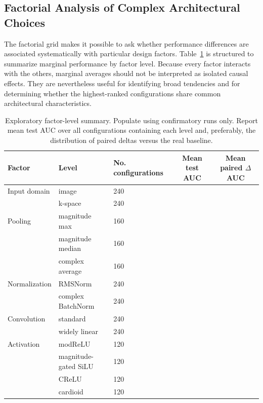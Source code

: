 \documentclass[journal]{IEEEtran}
\begin{document}
\subsection{Factorial Analysis of Complex Architectural Choices}
The factorial grid makes it possible to ask whether performance differences are associated systematically with particular design factors. Table~\ref{tab:factorresults} is structured to summarize marginal performance by factor level. Because every factor interacts with the others, marginal averages should not be interpreted as isolated causal effects. They are nevertheless useful for identifying broad tendencies and for determining whether the highest-ranked configurations share common architectural characteristics.

\begin{table}[t]
\centering
\caption{Exploratory factor-level summary. Populate using confirmatory runs only. Report mean test AUC over all configurations containing each level and, preferably, the distribution of paired deltas versus the real baseline.}
\label{tab:factorresults}
\scriptsize
\begin{tabular}{lllcc}
\toprule
Factor & Level & No. configurations & Mean test AUC & Mean paired $\Delta$AUC \\
\midrule
Input domain & image & 240 & \rev{[ ]} & \rev{[ ]} \\
             & k-space & 240 & \rev{[ ]} & \rev{[ ]} \\
Pooling & magnitude max & 160 & \rev{[ ]} & \rev{[ ]} \\
        & magnitude median & 160 & \rev{[ ]} & \rev{[ ]} \\
        & complex average & 160 & \rev{[ ]} & \rev{[ ]} \\
Normalization & RMSNorm & 240 & \rev{[ ]} & \rev{[ ]} \\
              & complex BatchNorm & 240 & \rev{[ ]} & \rev{[ ]} \\
Convolution & standard & 240 & \rev{[ ]} & \rev{[ ]} \\
            & widely linear & 240 & \rev{[ ]} & \rev{[ ]} \\
Activation & modReLU & 120 & \rev{[ ]} & \rev{[ ]} \\
           & magnitude-gated SiLU & 120 & \rev{[ ]} & \rev{[ ]} \\
           & CReLU & 120 & \rev{[ ]} & \rev{[ ]} \\
           & cardioid & 120 & \rev{[ ]} & \rev{[ ]} \\
\bottomrule
\end{tabular}
\end{table}
\end{document}
